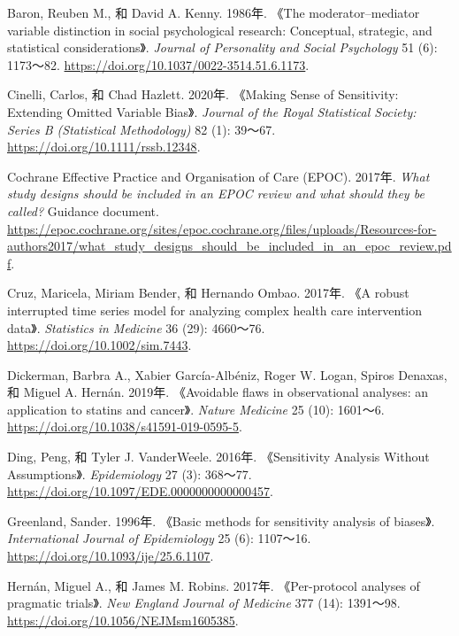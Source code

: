 \documentclass[
  chinese-hans,
  letterpaper,
  DIV=11,
  numbers=noendperiod]{scrreprt}
\newlength{\cslhangindent}
\newenvironment{CSLReferences}[2] %
 {\begin{list}{}{%
  \setlength{\itemindent}{0pt}
  \setlength{\leftmargin}{0pt}
  \setlength{\parsep}{0pt}
  \ifodd #1
   \setlength{\leftmargin}{\cslhangindent}
   \setlength{\itemindent}{-1\cslhangindent}
  \fi
  \setlength{\itemsep}{#2\baselineskip}}}
 {\end{list}}
\begin{document}
\protect{}\label{refs}
\begin{CSLReferences}{1}{1}
Baron, Reuben M., 和 David A. Kenny. 1986年. {《The moderator--mediator
variable distinction in social psychological research: Conceptual,
strategic, and statistical considerations》}. \emph{Journal of
Personality and Social Psychology} 51 (6): 1173～82.
\url{https://doi.org/10.1037/0022-3514.51.6.1173}.

Cinelli, Carlos, 和 Chad Hazlett. 2020年. {《Making Sense of
Sensitivity: Extending Omitted Variable Bias》}. \emph{Journal of the
Royal Statistical Society: Series B (Statistical Methodology)} 82 (1):
39～67. \url{https://doi.org/10.1111/rssb.12348}.

Cochrane Effective Practice and Organisation of Care (EPOC). 2017年.
\emph{What study designs should be included in an {EPOC} review and what
should they be called?} Guidance document.
\url{https://epoc.cochrane.org/sites/epoc.cochrane.org/files/uploads/Resources-for-authors2017/what_study_designs_should_be_included_in_an_epoc_review.pdf}.

Cruz, Maricela, Miriam Bender, 和 Hernando Ombao. 2017年. {《A robust
interrupted time series model for analyzing complex health care
intervention data》}. \emph{Statistics in Medicine} 36 (29): 4660～76.
\url{https://doi.org/10.1002/sim.7443}.

Dickerman, Barbra A., Xabier García-Albéniz, Roger W. Logan, Spiros
Denaxas, 和 Miguel A. Hernán. 2019年. {《Avoidable flaws in
observational analyses: an application to statins and cancer》}.
\emph{Nature Medicine} 25 (10): 1601～6.
\url{https://doi.org/10.1038/s41591-019-0595-5}.

Ding, Peng, 和 Tyler J. VanderWeele. 2016年. {《Sensitivity Analysis
Without Assumptions》}. \emph{Epidemiology} 27 (3): 368～77.
\url{https://doi.org/10.1097/EDE.0000000000000457}.

Greenland, Sander. 1996年. {《Basic methods for sensitivity analysis of
biases》}. \emph{International Journal of Epidemiology} 25 (6):
1107～16. \url{https://doi.org/10.1093/ije/25.6.1107}.

Hernán, Miguel A., 和 James M. Robins. 2017年. {《Per-protocol analyses
of pragmatic trials》}. \emph{New England Journal of Medicine} 377 (14):
1391～98. \url{https://doi.org/10.1056/NEJMsm1605385}.


\end{CSLReferences}
\end{document}
